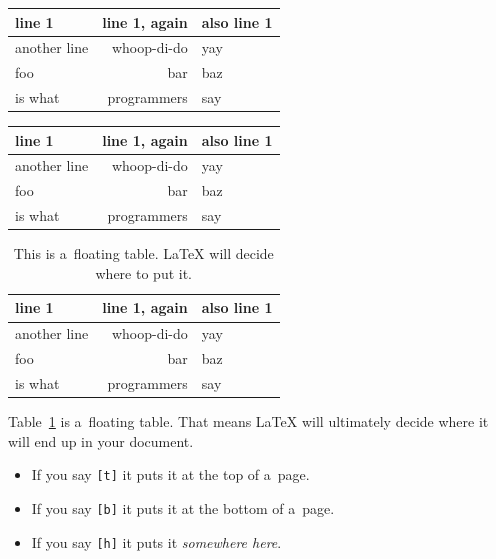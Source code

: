 \documentclass{scrartcl}
\begin{document}
\begin{center}
  \begin{tabular}{|l|r|l|}
    \hline
    line 1 & line 1, again & also line 1 \\
    \hline
    another line & whoop-di-do & yay \\
    \hline
    foo & bar & baz \\
    \hline
    is what & programmers & say \\
    \hline
  \end{tabular}
\end{center}

\begin{center}
  \begin{tabular}{lrl}
    \toprule
    line 1 & line 1, again & also line 1 \\
    \midrule
    another line & whoop-di-do & yay \\
    foo & bar & baz \\
    is what & programmers & say \\
    \bottomrule
  \end{tabular}
\end{center}

\begin{table}[h]
  \centering%
  \begin{tabular}{lrl}
    \toprule
    line 1 & line 1, again & also line 1 \\
    \midrule
    another line & whoop-di-do & yay \\
    foo & bar & baz \\
    is what & programmers & say \\
    \bottomrule
  \end{tabular}
  \caption{This is a~floating table.  \LaTeX{} will decide where to put it.}
  \label{tab:my-table}
\end{table}

Table~\ref{tab:my-table} is a~floating table.
That means \LaTeX{} will ultimately decide where it will end up in your
document.

\begin{itemize}
  \item If you say \texttt{[t]} it puts it at the top of a~page.
  \item If you say \texttt{[b]} it puts it at the bottom of a~page.
  \item If you say \texttt{[h]} it puts it \emph{somewhere here}\texttrademark.
\end{itemize}
\end{document}
